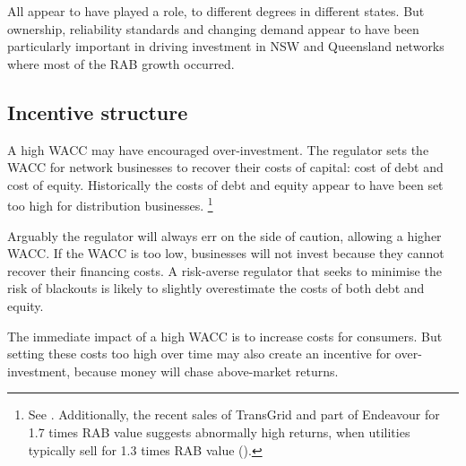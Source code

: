 \documentclass[FrontPage]{grattan}
\begin{document}
All appear to have played a role, to different degrees in different states. But ownership, reliability standards and changing demand appear to have been particularly important in driving investment in NSW and Queensland networks where most of the RAB growth occurred.

\subsection{Incentive structure}\label{subsec:incentive-structure}
A high WACC may have encouraged over-investment. The regulator sets the WACC for network businesses to recover their costs of capital: cost of debt and cost of equity. Historically the costs of debt and equity appear to have been set too high for distribution businesses.%
\footnote{See \textcite{WoodHunterOTooleEtAl2012}. Additionally, the recent sales of TransGrid and part of Endeavour for 1.7 times RAB value suggests abnormally high returns, when utilities typically sell for 1.3 times RAB value (\textcites{AFR2016AusgridPrice}{Morgans2017UtilitiesSales}).}

Arguably the regulator will always err on the side of caution, allowing a higher WACC\@. If the WACC is too low, businesses will not invest because they cannot recover their financing costs. A risk-averse regulator that seeks to minimise the risk of blackouts is likely to slightly overestimate the costs of both debt and equity. 

The immediate impact of a high WACC is to increase costs for consumers. But setting these costs too high over time may also create an incentive for over-investment, because money will chase above-market returns. 
\end{document}
